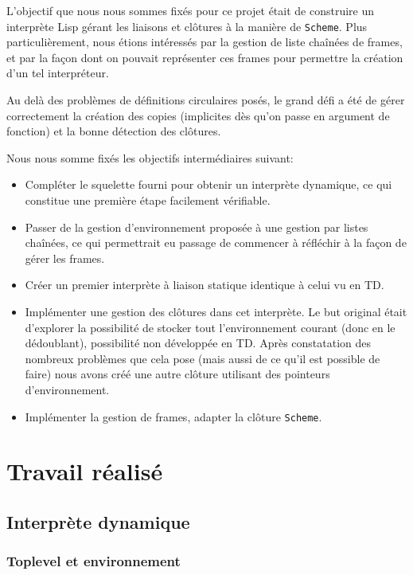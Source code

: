 \documentclass[a4paper,11pt]{article}
\begin{document}
L'objectif que nous nous sommes fixés pour ce projet était de construire un
interprète Lisp gérant les liaisons et clôtures à la manière de \texttt{Scheme}. Plus
particulièrement, nous étions intéressés par la gestion de liste chaînées de
frames, et par la façon dont on pouvait représenter ces frames pour permettre la
création d'un tel interpréteur.

Au delà des problèmes de définitions circulaires posés, le grand défi a été de
gérer correctement la création des copies (implicites dès qu'on passe en
argument de fonction) et la bonne détection des clôtures.

Nous nous somme fixés les objectifs intermédiaires suivant:
\begin{itemize}
\item Compléter le squelette fourni pour obtenir un interprète dynamique, ce qui
  constitue une première étape facilement vérifiable.
\item Passer de la gestion d'environnement proposée à une gestion par listes
  chaînées, ce qui permettrait eu passage de commencer à réfléchir à la façon de
  gérer les frames.
\item Créer un premier interprète à liaison statique identique à celui vu en TD.
\item Implémenter une gestion des clôtures dans cet interprète. Le but original
  était d'explorer la possibilité de stocker tout l'environnement courant (donc
  en le dédoublant), possibilité non développée en TD. Après constatation des
  nombreux problèmes que cela pose (mais aussi de ce qu'il est possible de
  faire) nous avons créé une autre clôture utilisant des pointeurs
  d'environnement.
\item Implémenter la gestion de frames, adapter la clôture \texttt{Scheme}.
\end{itemize}


\section{Travail réalisé}

\subsection{Interprète dynamique}

\subsubsection{Toplevel et environnement}
\end{document}
